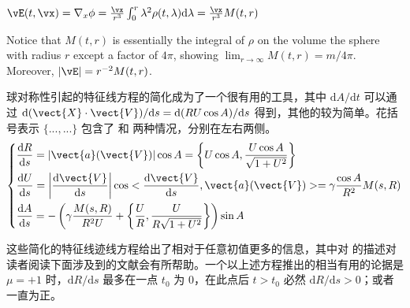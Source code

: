 $\vE( t,\vx)=\nabla_{x} \phi=\frac{\vx}{r^{3}} \int_{0}^{r} \lambda^{2} \rho(t, \lambda)  \mathrm{d} \lambda = \frac{\vx}{r^3} M(t, r)$

Notice that $M(t, r)$ is essentially the integral of $\rho$ on the volume the sphere with radius $r$ except a factor of $4\pi$, showing $\lim_{r\rightarrow \infty} M(t, r)= m/4\pi$. Moreover, $|\vE|=r^{-2}M(t,r)$.

球对称性引起的特征线方程的简化成为了一个很有用的工具，其中 $\mathrm{d}A/\mathrm{d}t$ 可以通过 $\mathrm{d}(\vect{X}\cdot \vect{V})/\mathrm{d} s = \mathrm{d}(RU\cos A)/\mathrm{d}s$ 得到，其他的较为简单。花括号表示 $\{... ,...\}$ 包含了 \eqvp 和 \eqrvp 两种情况，分别在左右两侧。 
\begin{equation}\left\{\begin{aligned}
    &\frac{\mathrm{d} R}{\mathrm{d} s}=|\vect{a}(\vect{V})|\cos A =\left\{ U \cos A,  \frac{U \cos A}{\sqrt{1+U^{2}}} \right\}  \\
    &\frac{\mathrm{d} U}{\mathrm{d} s}=\left| \frac{\mathrm{d}\vect{V}}{\mathrm{d}s} \right| \cos<\frac{\mathrm{d}\vect{V}}{\mathrm{d}s}, \vect{a}(\vect{V})>=\gamma \frac{\cos A}{R^{2}} M(s, R) \\
    &\frac{\mathrm{d} A}{\mathrm{d} s}=-\left(\gamma \frac{M(s, R)}{R^{2} U}+ \left\{\frac{U}{R},   \frac{U}{R \sqrt{1+U^{2}}} \right\}  \right) \sin A
\end{aligned}\right.\end{equation}

这些简化的特征线迹线方程给出了相对于任意初值更多的信息，其中对 \eqrvp 的描述对读者阅读下面涉及到的文献会有所帮助。一个以上述方程推出的相当有用的论据是 $\mu=+1$ 时，$\mathrm{d}R/\mathrm{d}s$ 最多在一点 $t_0$ 为 0，在此点后 $t>t_0$ 必然 $\mathrm{d}R/\mathrm{d}s>0$；或者一直为正。 

